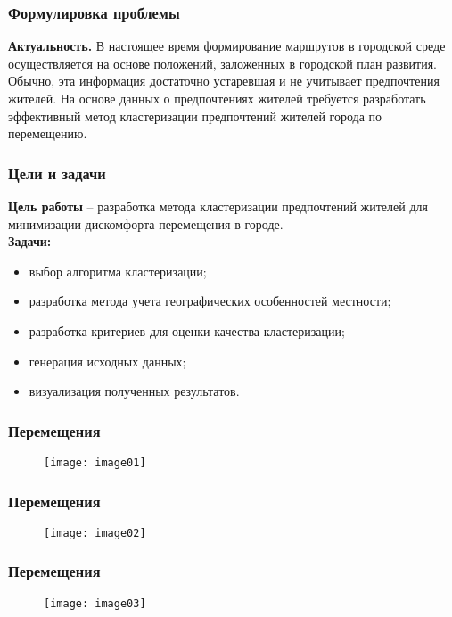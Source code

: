 \begin{frame}
    \frametitle{Формулировка проблемы}
    \textbf{Актуальность.} В настоящее время формирование маршрутов в городской
    среде осуществляется на основе положений, заложенных в городской план
    развития. Обычно, эта информация достаточно устаревшая и не учитывает
    предпочтения жителей. На основе данных о предпочтениях жителей требуется
    разработать эффективный метод кластеризации предпочтений жителей города
    по перемещению.
\end{frame}

\begin{frame} %
    \frametitle{Цели и задачи}
    \textbf{Цель работы} -- разработка метода кластеризации предпочтений
    жителей для минимизации дискомфорта перемещения в городе.\\
    \textbf{Задачи:}
    \begin{itemize}
        \item выбор алгоритма кластеризации;
        \item разработка метода учета географических особенностей местности;
        \item разработка критериев для оценки качества кластеризации;
        \item генерация исходных данных;
        \item визуализация полученных результатов.
    \end{itemize}
\end{frame}

\begin{frame}
    \frametitle{Перемещения}
    \begin{figure}
        \center
        \texttt{[image: image01]}
    \end{figure}
\end{frame}

\begin{frame}
    \frametitle{Перемещения}
    \begin{figure}
        \center
        \texttt{[image: image02]}
    \end{figure}
\end{frame}

\begin{frame}
    \frametitle{Перемещения}
    \begin{figure}
        \center
        \texttt{[image: image03]}
    \end{figure}
\end{frame}

